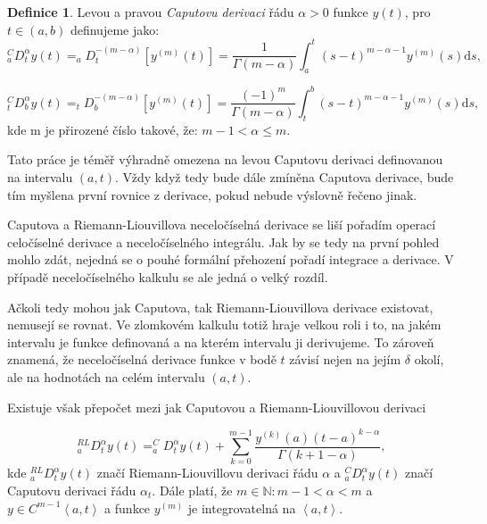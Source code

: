 \documentclass[a4paper,12pt,twoside]{article}
\theoremstyle{definition}
\newtheorem{defin}[veta]{Definice}
\theoremstyle{remark}
\numberwithin{equation}{section}
\numberwithin{table}{section}
\numberwithin{figure}{section}
\newcommand{\dx}[1]{\mathrm{d} #1}
\newcommand{\N}{\mathbb{N}}
\begin{document}
\begin{defin}%
	Levou a pravou \emph{Caputovu derivaci} řádu $\alpha > 0$ funkce $y\left(t\right)$, pro $t \in \left(a,b\right) $ definujeme jako:
\begin{equation} \label{CaputoDerivace} ^{C}_{a}D_{t}^{\alpha} y\left(t\right) = _{a}D_{t}^{- \left(m-\alpha\right) }\left[y^{\left(m\right)} \left(t\right)\right] = \frac{1}{\Gamma\left(m-\alpha\right)} \int_{a}^{t} \left(s-t\right)^{m-\alpha-1}y^{\left(m\right)} \left(s\right) \dx s,\end{equation}

$$^{C}_{t}D_{b}^{\alpha} y\left(t\right) = _{t}D_{b}^{- \left(m-\alpha\right) }\left[y^{\left(m\right)} \left(t\right)\right] = \frac{\left(-1\right)^m}{\Gamma\left(m-\alpha\right)} \int_{t}^{b} \left(s-t\right)^{m-\alpha-1}y^{\left(m\right)} \left(s\right) \dx s,$$
kde m je přirozené číslo takové, že: $m-1<\alpha\leq m$.
\end{defin}

Tato práce je téměř výhradně omezena na levou Caputovu derivaci definovanou na intervalu $\left(a, t\right)$. Vždy když tedy bude dále zmíněna Caputova derivace, bude tím myšlena první rovnice z derivace, pokud nebude výslovně řečeno jinak.

Caputova a Riemann-Liouvillova neceločíselná derivace se liší pořadím operací celočíselné derivace a neceločíselného integrálu. Jak by se tedy na první pohled mohlo zdát, nejedná se o  pouhé formální přehození pořadí integrace a derivace. V případě neceločíselného kalkulu se ale jedná o velký rozdíl.

Ačkoli tedy mohou jak Caputova, tak Riemann-Liouvillova derivace existovat, nemusejí se rovnat.
Ve zlomkovém kalkulu totiž hraje velkou roli i to, na jakém intervalu je funkce definovaná a na kterém intervalu ji derivujeme. To zároveň znamená, že neceločíselná derivace funkce v bodě $t$ závisí nejen na jejím $\delta$ okolí, ale na hodnotách na celém intervalu $\left(a, t\right)$.

Existuje však přepočet mezi jak Caputovou a Riemann-Liouvillovou derivaci

\begin{equation}\label{PrepocetRL->C1}
	_{a}^{RL}D^{\alpha}_{t} y\left(t\right) =  _{a}^{C}D^{\alpha}_{t} y\left(t\right) + \sum_{k=0}^{m-1} \frac{y^{\left(k\right)}\left(a\right)\left(t-a\right)^{k-\alpha}}{\Gamma\left(k+1-\alpha\right)},
\end{equation}
kde $_{a}^{RL}D^{\alpha}_{t} y\left(t\right)$ značí Riemann-Liouvillovu derivaci řádu $\alpha$ a $_{a}^{C}D^{\alpha}_{t} y\left(t\right)$ značí Caputovu derivaci řádu $\alpha_{t}$. Dále platí, že $m \in \N: m-1<\alpha<m$ a $y\in C^{m-1}\left<a, t\right>$ a funkce $y^{\left(m\right)}$ je integrovatelná na $\left< a, t \right>$.
\end{document}
